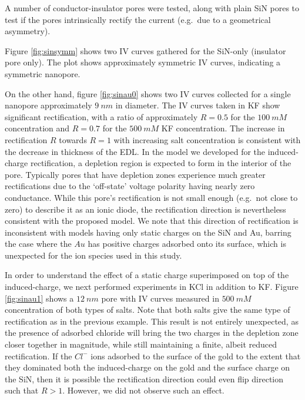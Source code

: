 		A number of conductor-insulator pores were tested, along with plain SiN pores to test if the pores intrinsically rectify the current (e.g.~due to a geometrical asymmetry).
		
		Figure \ref{fig:sinsymm} shows two IV curves gathered for the SiN-only (insulator pore only). The plot shows approximately symmetric IV curves, indicating a symmetric nanopore. 
		
		On the other hand, figure \ref{fig:sinau0} shows two IV curves collected for a single nanopore approximately $\SI{9}{nm}$ in diameter. The IV curves taken in KF show significant rectification, with a ratio of approximately $R=0.5$ for the $\SI{100}{mM}$ concentration and $R=0.7$ for the $\SI{500}{mM}$ KF concentration. The increase in rectification $R$ towards $R=1$ with increasing salt concentration is consistent with the decrease in thickness of the EDL. In the model we developed for the induced-charge rectification, a depletion region is expected to form in the interior of the pore. Typically pores that have depletion zones experience much greater rectifications due to the `off-state' voltage polarity having nearly zero conductance. While this pore's rectification is not small enough (e.g.~not close to zero) to describe it as an ionic diode, the rectification direction is nevertheless consistent with the proposed model. We note that this direction of rectification is inconsistent with models having only static charges on the SiN and Au, barring the case where the $Au$ has positive charges adsorbed onto its surface, which is unexpected for the ion species used in this study.
		
		In order to understand the effect of a static charge superimposed on top of the induced-charge, we next performed experiments in KCl in addition to KF. Figure \ref{fig:sinau1} shows a $\SI{12}{nm}$ pore with IV curves measured in $\SI{500}{mM}$ concentration of both types of salts. Note that both salts give the same type of rectification as in the previous example. This result is not entirely unexpected, as the presence of adsorbed chloride will bring the two charges in the depletion zone closer together in magnitude, while still maintaining a finite, albeit reduced rectification. If the $Cl^{-}$ ions adsorbed to the surface of the gold to the extent that they dominated both the induced-charge on the gold and the surface charge on the SiN, then it is possible the rectification direction could even flip direction such that $R>1$. However, we did not observe such an effect.
		
